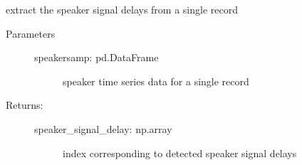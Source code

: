 \documentclass[letterpaper,10pt,english]{sphinxmanual}
\begin{document}
\begin{fulllineitems}
\label{\detokenize{code:ATom.atom_functions.get_speaker_signal_delay}}
extract the speaker signal delays from a single record
\begin{description}
\item[{Parameters}] \leavevmode\begin{description}
\item[{speakersamp: pd.DataFrame}] \leavevmode
speaker time series data for a single record

\end{description}

\item[{Returns:}] \leavevmode\begin{description}
\item[{speaker\_signal\_delay: np.array}] \leavevmode
index corresponding to detected speaker signal delays

\end{description}

\end{description}

\end{fulllineitems}

\end{document}
